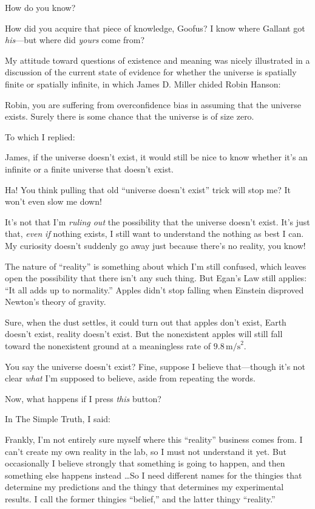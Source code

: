 {
 How do you know?}

{
 How did you acquire that piece of knowledge, Goofus? I know where
Gallant got \textit{his}{}---but where did \textit{yours} come from?}

{
 My attitude toward questions of existence and meaning was nicely
illustrated in a discussion of the current state of evidence for
whether the universe is spatially finite or spatially infinite, in
which James D. Miller chided Robin Hanson:}

{
 Robin, you are suffering from overconfidence bias in assuming that
the universe exists. Surely there is some chance that the universe is
of size zero.}

{
 To which I replied:}

{
 James, if the universe doesn't exist, it would
still be nice to know whether it's an infinite or a
finite universe that doesn't exist.}

{
 Ha! You think pulling that old ``universe
doesn't exist'' trick will stop me?
It won't even slow me down!}

{
 It's not that I'm \textit{ruling
out} the possibility that the universe doesn't exist.
It's just that, \textit{even} \textit{if} nothing
exists, I still want to understand the nothing as best I can. My
curiosity doesn't suddenly go away just because
there's no reality, you know!}

{
 The nature of ``reality'' is
something about which I'm still confused, which leaves
open the possibility that there isn't any such thing.
But Egan's Law still applies: ``It all
adds up to normality.'' Apples didn't
stop falling when Einstein disproved Newton's theory of
gravity.}

{
 Sure, when the dust settles, it could turn out that apples
don't exist, Earth doesn't exist,
reality doesn't exist. But the nonexistent apples will
still fall toward the nonexistent ground at a meaningless rate of $9.8 \,
\mathrm{m/s}^{2}$.}

{
 You say the universe doesn't exist? Fine, suppose
I believe that---though it's not clear \textit{what}
I'm supposed to believe, aside from repeating the
words.}

{
 Now, what happens if I press \textit{this} button?}

{
 In The Simple Truth, I said:}

{
 Frankly, I'm not entirely sure myself where this
``reality'' business comes from. I
can't create my own reality in the lab, so I must not
understand it yet. But occasionally I believe strongly that something
is going to happen, and then something else happens instead \ldots So I
need different names for the thingies that determine my predictions and
the thingy that determines my experimental results. I call the former
thingies ``belief,'' and the latter
thingy ``reality.''}

